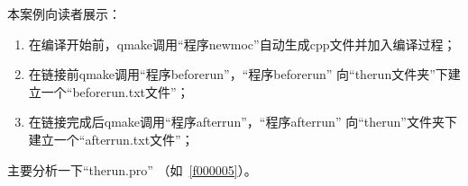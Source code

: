 本案例向读者展示：
\begin{enumerate}
\item 在编译开始前，qmake调用“程序new\underline{\hspace{0.5em}}moc”自动生成cpp文件并加入编译过程；
\item 在链接前qmake调用“程序before\underline{\hspace{0.5em}}run”，“程序before\underline{\hspace{0.5em}}run”
向“the\underline{\hspace{0.5em}}run文件夹”下建立一个“before\underline{\hspace{0.5em}}run.txt文件”；
\item 在链接完成后qmake调用“程序after\underline{\hspace{0.5em}}run”，“程序after\underline{\hspace{0.5em}}run”
向“the\underline{\hspace{0.5em}}run”文件夹下建立一个“after\underline{\hspace{0.5em}}run.txt文件”；
\end{enumerate}

主要分析一下“the\underline{\hspace{0.5em}}run.pro”
（如\filesourcenumbernameone\ \ref{f000005}）。


